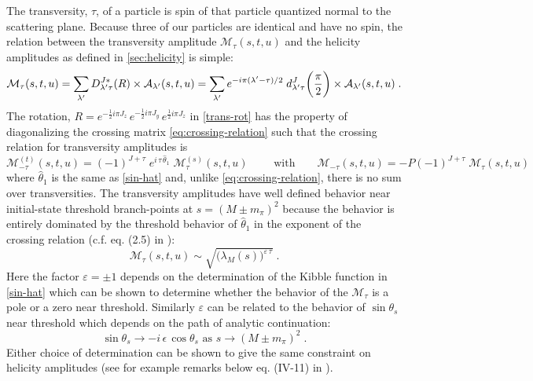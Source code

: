 The transversity, \(\tau\), of a particle is spin of that particle quantized normal to the scattering plane. Because three of our particles are identical and have no spin, the relation between the transversity amplitude \(\mathcal{M}_\tau(s,t,u)\) and the helicity amplitudes as defined in \cref{sec:helicity} is simple:
  \begin{equation} \label{trans-rot}
    \mathcal{M}_\tau (s,t,u) = \sum_{\lambda^\prime} D_{{\lambda^\prime} \tau}^{J*}(R) \times \mathcal{A}_{\lambda^\prime}(s,t,u)
    = \sum_{{\lambda^\prime}} e^{- i \pi ({\lambda^\prime} - \tau) /2} \; d^J_{{\lambda^\prime} \tau}\bigg(\frac{\pi}{2}\bigg) \times \mathcal{A}_{\lambda^\prime}(s,t,u) \; .
    \end{equation}
The rotation, \(R = e^{-\frac{1}{2} i \pi J_z}\, e^{-\frac{1}{2} i \pi J_y} \, e^{\frac{1}{2} i \pi J_z}\) in \cref{trans-rot} has the property of diagonalizing the crossing matrix \cref{eq:crossing-relation} such that the crossing relation for transversity amplitudes is
  \begin{equation}
    \mathcal{M}^{(t)}_{-\tau}(s,t,u) = (-1)^{J+\tau} \; e^{i \, \tau \, \hat{\theta}_1} \; \mathcal{M}^{(s)}_\tau(s,t,u)
    \qquad \text{ with} \qquad
    \mathcal{M}_{-\tau}(s,t,u) = - P(-1)^{J+\tau} \; \mathcal{M}_\tau(s,t,u)
  \end{equation}
where \(\hat{\theta}_1\) is the same as \cref{sin-hat} and, unlike \cref{eq:crossing-relation}, there is no sum over transversities.
The transversity amplitudes have well defined behavior near initial-state threshold branch-points at \(s= (M\pm m_\pi)^2\) because the behavior is entirely dominated by the threshold behavior of \(\hat{\theta}_1\) in the exponent of the crossing relation (c.f. eq. (2.5) in \cite{Kotanski1968}):
  \begin{equation} \label{trans-constraint}
    \mathcal{M}_\tau(s,t,u) \sim \sqrt{\big(\lambda_M(s)\big)^{\varepsilon \, \tau}}\; .
  \end{equation}
Here the factor \(\varepsilon = \pm 1\) depends on the determination of the Kibble function in \cref{sin-hat} which can be shown to determine whether the behavior of the \(\mathcal{M}_\tau\) is a pole or a zero near threshold. Similarly \(\varepsilon\) can be related to the behavior of \(\sin \theta_s\) near threshold which depends on the path of analytic continuation:
  \begin{equation} \label{epsilon_sin}
    \sin \theta_s \longrightarrow - i  \,\epsilon \, \cos \theta_s \text{ as } s \to (M \pm m_\pi)^2 \; .
  \end{equation}
 Either choice of determination can be shown to give the same constraint on helicity amplitudes (see for example remarks below eq. (IV-11) in \cite{Cohen-Tannoudji1968}).

